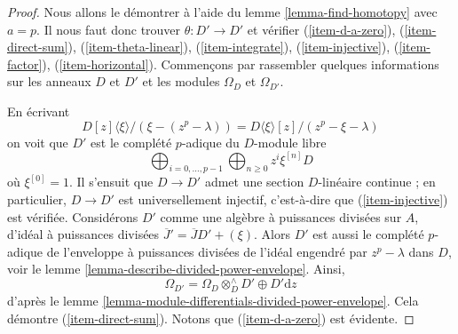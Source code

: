 \begin{proof}
Nous allons le démontrer à l'aide du lemme \ref{lemma-find-homotopy} avec $a = p$.
Il nous faut donc trouver $\theta : D' \to D'$ et vérifier
(\ref{item-d-a-zero}), (\ref{item-direct-sum}), (\ref{item-theta-linear}),
(\ref{item-integrate}), (\ref{item-injective}), (\ref{item-factor}),
(\ref{item-horizontal}). Commençons par rassembler quelques informations sur les anneaux
$D$ et $D'$ et les modules $\Omega_D$ et $\Omega_{D'}$.

\medskip\noindent
En écrivant
$$
D[z]\langle \xi \rangle/(\xi - (z^p - \lambda))
=
D\langle \xi \rangle[z]/(z^p - \xi - \lambda)
$$
on voit que $D'$ est le complété $p$-adique du $D$-module libre
$$
\bigoplus\nolimits_{i = 0, \ldots, p - 1}
\bigoplus\nolimits_{n \geq 0}
z^i \xi^{[n]} D
$$
où $\xi^{[0]} = 1$.
Il s'ensuit que $D \to D'$ admet une section $D$-linéaire continue ; en particulier,
$D \to D'$ est universellement injectif, c'est-à-dire que (\ref{item-injective}) est vérifiée.
Considérons $D'$ comme une algèbre à puissances divisées
sur $A$, d'idéal à puissances divisées $\overline{J}' = \overline{J}D' + (\xi)$.
Alors $D'$ est aussi le complété $p$-adique de l'enveloppe à puissances divisées
de l'idéal engendré par $z^p - \lambda$ dans $D$, voir le
lemme \ref{lemma-describe-divided-power-envelope}. Ainsi,
$$
\Omega_{D'} = \Omega_D \otimes_D^\wedge D' \oplus D'\text{d}z
$$
d'après le lemme \ref{lemma-module-differentials-divided-power-envelope}.
Cela démontre (\ref{item-direct-sum}). Notons que (\ref{item-d-a-zero})
est évidente.


\end{proof}
